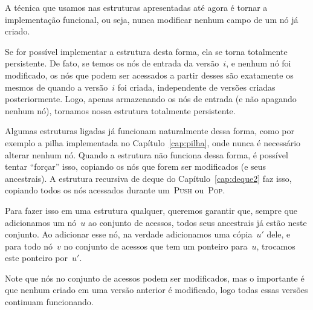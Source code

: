 \documentclass[../../main.tex]{subfiles}
\begin{document}
A técnica que usamos nas estruturas apresentadas até agora é tornar a implementação funcional, ou seja, nunca modificar nenhum campo de um nó já criado.

Se for possível implementar a estrutura desta forma, ela se torna totalmente persistente. De fato, se temos os nós de entrada da versão~$i$, e nenhum nó foi modificado, os nós que podem ser acessados a partir desses são exatamente os mesmos de quando a versão~$i$ foi criada, independente de versões criadas posteriormente. Logo, apenas armazenando os nós de entrada (e não apagando nenhum nó), tornamos nossa estrutura totalmente persistente.

Algumas estruturas ligadas já funcionam naturalmente dessa forma, como por exemplo a pilha implementada no Capítulo~\ref{cap:pilha}, onde nunca é necessário alterar nenhum nó. Quando a estrutura não funciona dessa forma, é possível tentar ``forçar'' isso, copiando os nós que forem ser modificados (e seus ancestrais). A estrutura recursiva de deque do Capítulo~\ref{cap:deque2} faz isso, copiando todos os nós acessados durante um~\textsc{Push} ou~\textsc{Pop}.

Para fazer isso em uma estrutura qualquer, queremos garantir que, sempre que adicionamos um nó~$u$ ao conjunto de acessos, todos seus ancestrais já estão neste conjunto. Ao adicionar esse nó, na verdade adicionamos uma cópia~$u'$ dele, e para todo nó~$v$ no conjunto de acessos que tem um ponteiro para~$u$, trocamos este ponteiro por~$u'$.

Note que nós no conjunto de acessos podem ser modificados, mas o importante é que nenhum criado em uma versão anterior é modificado, logo todas essas versões continuam funcionando.
\end{document}
